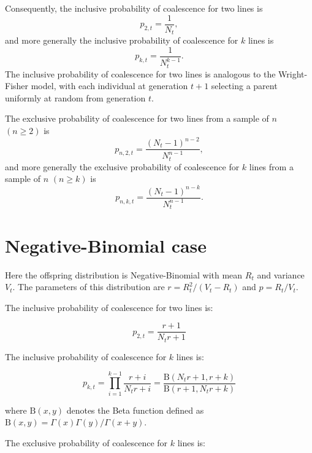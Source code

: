 \documentclass{article}
\begin{document}
Consequently, the inclusive probability of coalescence for two lines is
\begin{equation}
	p_{2,t}=\frac{1}{N_t},
\end{equation}
and more generally the inclusive probability of coalescence for $k$ lines is
\begin{equation}
	p_{k,t}=\frac{1}{N_t^{k-1}}.
\end{equation}
The inclusive probability of coalescence for two lines is analogous to the Wright-Fisher model, with each individual at generation $t+1$ selecting a parent uniformly at random from generation $t$.



The exclusive probability of coalescence for two lines from a sample of $n$ $(n \geq 2)$ is
	\begin{equation}
		p_{n,2,t} = \frac{(N_t-1)^{n-2}}{N_t^{n-1}},
	\end{equation}
and more generally the exclusive probability of coalescence for $k$ lines from a sample of $n$ $(n \geq k)$ is
	\begin{equation}
		p_{n,k,t} = \frac{(N_t-1)^{n-k}}{N_t^{n-1}}.
	\end{equation}

\section{Negative-Binomial case}

Here the offspring distribution is Negative-Binomial with mean $R_t$ and variance $V_t$.
The parameters of this distribution are 
$r=R_t^2/(V_t-R_t)$ and $p=R_t/V_t$.

The inclusive probability of coalescence for two lines is:

\begin{equation}
p_{2,t}=\frac{r+1}{N_t r+1}
\end{equation}

The inclusive probability of coalescence for $k$ lines is:

\begin{equation}
p_{k,t}=\prod_{i=1}^{k-1}\frac{r+i}{N_t r+i}=\frac{\mathrm{B}(N_t r+1,r+k)}{\mathrm{B}(r+1,N_t r+k)}
\end{equation}

\noindent where  $\mathrm{B}(x,y)$ denotes the Beta function defined as $\mathrm{B}(x,y)=\Gamma(x)\Gamma(y)/\Gamma(x+y)$.

The exclusive probability of coalescence for $k$ lines is:
\end{document}
